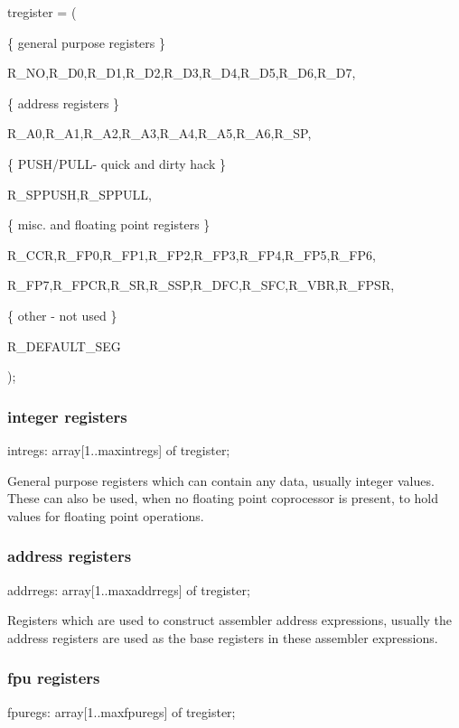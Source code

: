 \documentclass [12pt]{article}
\begin{document}
\textsf{tregister = (}

\textsf{{\{} general purpose registers {\}} }

\textsf{R{\_}NO,R{\_}D0,R{\_}D1,R{\_}D2,R{\_}D3,R{\_}D4,R{\_}D5,R{\_}D6,R{\_}D7,}

\textsf{{\{} address registers {\}}}

\textsf{R{\_}A0,R{\_}A1,R{\_}A2,R{\_}A3,R{\_}A4,R{\_}A5,R{\_}A6,R{\_}SP,}

\textsf{{\{} PUSH/PULL- quick and dirty hack {\}}}

\textsf{R{\_}SPPUSH,R{\_}SPPULL,}

\textsf{{\{} misc. and floating point registers {\}}}

\textsf{R{\_}CCR,R{\_}FP0,R{\_}FP1,R{\_}FP2,R{\_}FP3,R{\_}FP4,R{\_}FP5,R{\_}FP6,}

\textsf{R{\_}FP7,R{\_}FPCR,R{\_}SR,R{\_}SSP,R{\_}DFC,R{\_}SFC,R{\_}VBR,R{\_}FPSR,}

\textsf{{\{} other - not used {\}}}

\textsf{R{\_}DEFAULT{\_}SEG}

\textsf{);}

\subsubsection{integer registers}
\label{subsubsec:integer}

\textsf{intregs: array[1..maxintregs] of tregister;}

General purpose registers which can contain any data, usually integer 
values. These can also be used, when no floating point coprocessor is 
present, to hold values for floating point operations. 

\subsubsection{address registers}
\label{subsubsec:address}

\textsf{addrregs: array[1..maxaddrregs] of tregister;}

Registers which are used to construct assembler address expressions, usually 
the address registers are used as the base registers in these assembler 
expressions.

\subsubsection{fpu registers}
\label{subsubsec:mylabel25}

\textsf{fpuregs: array[1..maxfpuregs] of tregister;}
\end{document}
